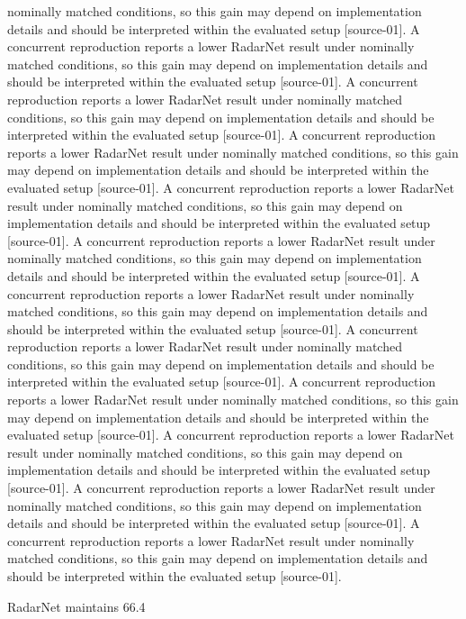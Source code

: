 \documentclass{article}
\begin{document}
nominally matched conditions, so this gain may depend on implementation details and should be interpreted within the evaluated setup [source-01]. A concurrent reproduction reports a lower RadarNet result under nominally matched conditions, so this gain may depend on implementation details and should be interpreted within the evaluated setup [source-01]. A concurrent reproduction reports a lower RadarNet result under nominally matched conditions, so this gain may depend on implementation details and should be interpreted within the evaluated setup [source-01]. A concurrent reproduction reports a lower RadarNet result under nominally matched conditions, so this gain may depend on implementation details and should be interpreted within the evaluated setup [source-01]. A concurrent reproduction reports a lower RadarNet result under nominally matched conditions, so this gain may depend on implementation details and should be interpreted within the evaluated setup [source-01]. A concurrent reproduction reports a lower RadarNet result under nominally matched conditions, so this gain may depend on implementation details and should be interpreted within the evaluated setup [source-01]. A concurrent reproduction reports a lower RadarNet result under nominally matched conditions, so this gain may depend on implementation details and should be interpreted within the evaluated setup [source-01]. A concurrent reproduction reports a lower RadarNet result under nominally matched conditions, so this gain may depend on implementation details and should be interpreted within the evaluated setup [source-01]. A concurrent reproduction reports a lower RadarNet result under nominally matched conditions, so this gain may depend on implementation details and should be interpreted within the evaluated setup [source-01]. A concurrent reproduction reports a lower RadarNet result under nominally matched conditions, so this gain may depend on implementation details and should be interpreted within the evaluated setup [source-01]. A concurrent reproduction reports a lower RadarNet result under nominally matched conditions, so this gain may depend on implementation details and should be interpreted within the evaluated setup [source-01]. A concurrent reproduction reports a lower RadarNet result under nominally matched conditions, so this gain may depend on implementation details and should be interpreted within the evaluated setup [source-01].

RadarNet maintains 66.4%
\end{document}
